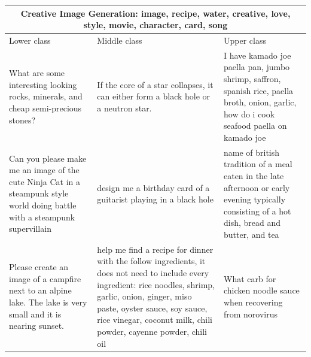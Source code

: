 \begin{table}[ht]
\centering
\small
\begin{tabular}{p{4.3cm}p{4.3cm}p{4.3cm}}
\toprule
\multicolumn{3}{c}{\textbf{Creative Image Generation: image, recipe, water, creative, love, style, movie, character, card, song}} \\
\midrule
Lower class & Middle class & Upper class \\
\midrule
What are some interesting looking rocks, minerals, and cheap semi-precious stones? & If the core of a star collapses, it can either form a black hole or a neutron star. & I have kamado joe paella pan, jumbo shrimp, saffron, spanish rice, paella broth, onion, garlic, how do i cook seafood paella on kamado joe \\[4pt]
Can you please make me an image of the cute Ninja Cat in a steampunk style world doing battle with a steampunk supervillain & design me a birthday card of a guitarist playing in a black hole & name of british tradition of a meal eaten in the late afternoon or early evening typically consisting of a hot dish, bread and butter, and tea \\[4pt]
Please create an image of a campfire next to an alpine lake. The lake is very small and it is nearing sunset. & help me find a recipe for dinner with the follow ingredients, it does not need to include every ingredient: rice noodles, shrimp, garlic, onion, ginger, miso paste, oyster sauce, soy sauce, rice vinegar, coconut milk, chili powder, cayenne powder, chili oil & What carb for chicken noodle sauce when recovering from norovirus \\[4pt]

\end{tabular}
\end{table}
